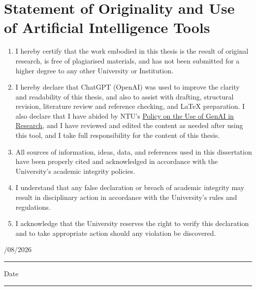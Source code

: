 \clearpage
\begingroup
\raggedright

\section*{\fontsize{14pt}{16pt}\selectfont Statement of Originality and Use of Artificial Intelligence Tools}

\vspace{0.4cm}

\begin{enumerate}[
  leftmargin=2.6em,
  labelsep=0.85em,
  itemindent=0pt,
  align=left,
  itemsep=1.15cm,
  topsep=0pt,
  parsep=0pt,
  partopsep=0pt
]
\setlength{\parskip}{0pt}

\item I hereby certify that the work embodied in this thesis is the result of original research, is free of plagiarised materials, and has not been submitted for a higher degree to any other University or Institution.

\item I hereby declare that ChatGPT (OpenAI) was used to improve the clarity and readability of this thesis, and also to assist with drafting, structural revision, literature review and reference checking, and LaTeX preparation. I also declare that I have abided by NTU's \uline{Policy on the Use of GenAI in Research}, and I have reviewed and edited the content as needed after using this tool, and I take full responsibility for the content of this thesis.

\item All sources of information, ideas, data, and references used in this dissertation have been properly cited and acknowledged in accordance with the University's academic integrity policies.

\item I understand that any false declaration or breach of academic integrity may result in disciplinary action in accordance with the University's rules and regulations.

\item I acknowledge that the University reserves the right to verify this declaration and to take appropriate action should any violation be discovered.

\end{enumerate}

\vfill

\noindent
\begin{minipage}[b]{0.42\textwidth}
  \centering
  {\fontsize{13pt}{15pt}/08/2026\par}
  \vspace{0.12cm}
  \rule{0.82\linewidth}{0.5pt}\par
  \vspace{0.15cm}
  Date
\end{minipage}
\hfill
\begin{minipage}[b]{0.42\textwidth}
  \centering
  \vspace*{0.9cm}
  \rule{0.82\linewidth}{0.5pt}\par
  \vspace{0.15cm}
  \AuthorName
\end{minipage}

\vspace*{0.45cm}
\endgroup
\clearpage
